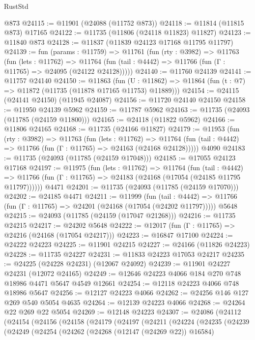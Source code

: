 \begin{lexlean}{RustStd}
\begin{coremodule}
    @873
@24115 := @11901 (@24088 (@11752 @873))
@24118 := @11814 (@11815 @873) @17165
@24122 := @11735 (@11806 (@24118 @11823) @11827)
@24123 := @11840 @873
@24128 := @11837 (@11839 @24123 @17168 @11795 @11797)
@24139 := fun (params : @11759) =>
  @11761
    (fun (rty : @3982) =>
    @11763
      (fun (lets : @11762) =>
      @11764 (fun (tail : @4442) => @11766 (fun (Γ : @11765) => @24095 (@24122 @24128)))))
@24140 := @11760 @24139
@24141 := @11757 @24140
@24150 := @11863
    (fun (U : @11862) => @11864 (fun (t : @7) => @11872 (@11735 (@11878 @17165 @11753) @11889)))
@24154 := @24115 (@24141 @24150) (@11945 @24087)
@24156 := @11720 @24140 @24150
@24158 := @11950 @24139 @5962
@24159 := @11787 @5962
@24163 := @11735 (@24093 (@11785 (@24159 @11800)))
@24165 := @24118 (@11822 @5962)
@24166 := @11806 @24165
@24168 := @11735 (@24166 @11827)
@24179 := @11953
    (fun (rty : @3982) =>
    @11763
      (fun (lets : @11762) =>
      @11764 (fun (tail : @4442) => @11766 (fun (Γ : @11765) => @24163 (@24168 @24128)))))
    @4090
@24183 := @11735 (@24093 (@11785 (@24159 @17048)))
@24185 := @17055 @24123 @17168
@24197 := @11975
    (fun (lets : @11762) =>
    @11764
      (fun (tail : @4442) =>
      @11766 (fun (Γ : @11765) => @24183 (@24168 (@17054 (@24185 @11795 @11797))))))
    @4471
@24201 := @11735 (@24093 (@11785 (@24159 @17070)))
@24202 := @24185 @4471
@24211 := @11999
    (fun (tail : @4442) => @11766 (fun (Γ : @11765) => @24201 (@24168 (@17054 (@24202 @11797)))))
    @5648
@24215 := @24093 (@11785 (@24159 (@17047 @21268)))
@24216 := @11735 @24215
@24217 := @24202 @5648
@24222 := @12017 (fun (Γ : @11765) => @24216 (@24168 (@17054 @24217)))
@24223 := @16847 @17100
@24224 := @24222 @24223
@24225 := @11901 @24215
@24227 := @24166 (@11826 @24223)
@24228 := @11735 @24227
@24231 := @11833 @24223 @17053 @24217
@24235 := @24225 (@24228 @24231) (@12067 @24092)
@24239 := @11901 @24227 @24231 (@12072 @24165)
@24249 := @12646 @24223 @4066 @184 @270 @748 @18986 @4471 @5647 @4549 @12661
@24254 := @12118 @24223 @4066 @748 @18986 @5647
@24256 := @12127 @24223 @4066
@24262 := @24256 @146 @127 @269 @540 @5054 @4635
@24264 := @12139 @24223 @4066
@24268 := @24264 @22 @269 @22 @5054
@24269 := @12148 @24223
@24307 := @24086
    (@24112
      (@24154
        (@24156
          (@24158
            (@24179
              (@24197
                (@24211
                  (@24224
                    (@24235
                      (@24239
                        (@24249
                          (@24254
                            (@24262
                              (@24268 (@12147 (@24269 @22)) @16584)

\end{coremodule}
\end{lexlean}
